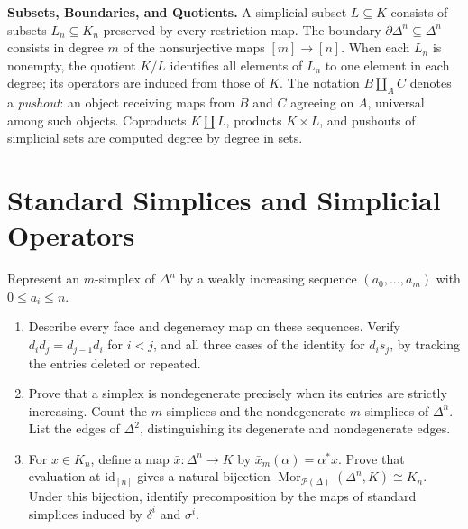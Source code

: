 \documentclass[11pt]{article}
\newcommand{\coursebold}[1]{{\color{burgundy}\textbf{#1}}}
\newcommand{\id}{\mathrm{id}}
\newcommand{\sSet}{\mathcal P(\Delta)}
\newcommand{\Mor}{\operatorname{Mor}}
\begin{document}
\coursebold{Subsets, Boundaries, and Quotients.}
A simplicial subset $L\subseteq K$ consists of subsets $L_n\subseteq K_n$
preserved by every restriction map. The boundary
$\partial\Delta^n\subseteq\Delta^n$ consists in degree $m$ of the
nonsurjective maps $[m]\to[n]$. When each $L_n$ is nonempty, the
quotient $K/L$ identifies all elements of $L_n$ to one element in each
degree; its operators are induced from those of $K$.
The notation $B\amalg_A C$ denotes a \emph{pushout}: an object receiving
maps from $B$ and $C$ agreeing on $A$, universal among such objects.
Coproducts $K\amalg L$, products $K\times L$, and pushouts of simplicial
sets are computed degree by degree in sets.


\section{Standard Simplices and Simplicial Operators}\label{ex:standard}
Represent an $m$-simplex of $\Delta^n$ by a weakly increasing sequence
$(a_0,\ldots,a_m)$ with $0\leq a_i\leq n$.
\begin{enumerate}
\item Describe every face and degeneracy map on these sequences. Verify
$d_i d_j=d_{j-1}d_i$ for $i<j$, and all three cases of the identity for
$d_i s_j$, by tracking the entries deleted or repeated.
\item Prove that a simplex is nondegenerate precisely when its entries
are strictly increasing. Count the $m$-simplices and the nondegenerate
$m$-simplices of $\Delta^n$. List the edges of $\Delta^2$, distinguishing
its degenerate and nondegenerate edges.
\item For $x\in K_n$, define a map $\bar x:\Delta^n\to K$ by
$\bar x_m(\alpha)=\alpha^*x$. Prove that evaluation at $\id_{[n]}$
gives a natural bijection $\Mor_{\sSet}(\Delta^n,K)\cong K_n$.
Under this bijection, identify precomposition by the maps of standard
simplices induced by $\delta^i$ and $\sigma^i$.
\end{enumerate}
\end{document}

